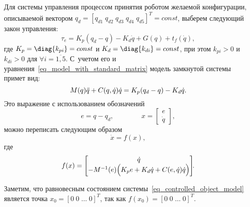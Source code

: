 Для системы управления процессом принятия роботом желаемой конфигурации, описываемой вектором $q_d = \left[ q_{d1} \; q_{d2} \; q_{d3} \; q_{d4} \; q_{d5} \right]^T = const$, выберем следующий закон управления:
\begin{equation}\label{eq_set_point_control_law}
    \tau_e = K_p (q_d - q) - K_d \dot{q} + G(q) + t_f(\dot{q}),
\end{equation}
где $K_p = \diag\{k_{pi}\} = const$ и $K_d = \diag\{k_{di}\} = const$, при этом $k_{pi}>0$ и $k_{di}>0$ для $\forall i=\overline{1,5}$.
С~учетом его и уравнения~\eqref{eq_model_with_standard_matrix} модель замкнутой системы примет вид:
\begin{equation}
    M(q) \ddot{q} + C(q,\dot{q}) \dot{q} = K_p (q_d - q) - K_d \dot{q}\ldotp
\end{equation}
Это выражение с использованием обозначений
\begin{equation}
    e = q - q_d,
    \qquad \qquad
    x =
    \begin{bmatrix}
        e \\ \dot{q}
    \end{bmatrix}\!\!,
\end{equation}
можно переписать следующим образом
\begin{equation}\label{eq_controlled_object_model}
    \dot{x} = f(x),
\end{equation}
где
\begin{equation}
    f(x) =
    \begin{bmatrix}
        \dot{q} \\
        -M^{-1}(e) \Bigl( K_p e + K_d \dot{q} + C(e,\dot{q}) \dot{q} \Bigr)
    \end{bmatrix}\!\!\ldotp
\end{equation}

Заметим, что равновесным состоянием системы~\eqref{eq_controlled_object_model} является точка \linebreak $x_0 = [0\;0\;\ldots\;0]^T$, так как $f(x_0) = [0\;0\;\ldots\;0]^T$.

